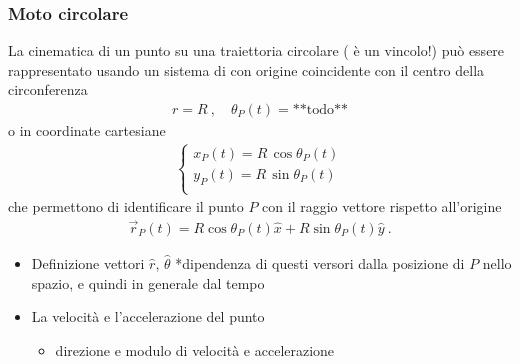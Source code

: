 \documentclass[letterpaper,10pt,italian]{jupyterBook}
\begin{document}
\subsubsection{Moto circolare}
\label{\detokenize{ch/mechanics/kinematics-point:moto-circolare}}\label{\detokenize{ch/mechanics/kinematics-point:physics-hs-mechanics-kinematics-point-motion-circular}}
\sphinxAtStartPar
La cinematica di un punto su una traiettoria circolare ( è un vincolo!) può essere rappresentato usando un sistema di  con origine coincidente con il centro della circonferenza
\begin{equation*}
\begin{split}r = R \ , \quad \theta_P(t)=\text{**todo**}\end{split}
\end{equation*}
\sphinxAtStartPar
o in coordinate cartesiane
\begin{equation*}
\begin{split}\begin{cases}
 x_P(t) = R \, \cos \theta_P(t) \\
 y_P(t) = R \, \sin \theta_P(t) \\
\end{cases}\end{split}
\end{equation*}
\sphinxAtStartPar
che permettono di identificare il punto \(P\) con il raggio vettore rispetto all’origine
\begin{equation*}
\begin{split}\vec{r}_P(t) = R \cos \theta_P(t) \hat{x} + R \sin \theta_P(t) \hat{y} \ .\end{split}
\end{equation*}\begin{itemize}
\item {} 
\sphinxAtStartPar
Definizione vettori \(\hat{r}\), \(\hat{\theta}\)  *dipendenza di questi versori dalla posizione di \(P\) nello spazio, e quindi in generale dal tempo

\item {} 
\sphinxAtStartPar
La velocità e l’accelerazione del punto 
\begin{itemize}
\item {} 
\sphinxAtStartPar
direzione e modulo di velocità e accelerazione

\end{itemize}

\end{itemize}
\end{document}
